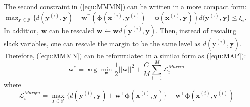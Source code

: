 The second constraint in (\ref{equ:MMMN}) can be written in a more compact form: 
$\max_{\mathbf{y}\in\mathcal{Y}} \{d(\mathbf{y}^{(i)},\mathbf{y})-{\mathbf{w}^\top} (\boldsymbol{\phi}(\mathbf{x}^{(i)},\mathbf{y}^{(i)})-\boldsymbol{\phi} 
        (\mathbf{x}^{(i)},\mathbf{y})) d(\mathbf{y}^{(i)},\mathbf{y}\}\leq \xi_i$. 
In addition, $\mathbf{w}$ can be rescaled $\mathbf{w}\gets \mathbf{w}d(\mathbf{y}^{(i)},\mathbf{y})$. 
Then, instead of rescaling slack variables, one can rescale the margin to be the same level as 
$d(\mathbf{y}^{(i)},\mathbf{y})$.  
Therefore, (\ref{equ:MMMN}) can be reformulated in a similar form as (\ref{equ:MAP}):
\begin{equation}
        \mathbf{w}^* = \arg\min_{\mathbf{w}} \frac{1}{2} ||\mathbf{w}||^2+ \frac{C}{M}\sum_{i=1}^M \mathcal{L}^{Margin}_i 
    \label{equ:MMMN_compact}
\end{equation}
where 
\begin{equation} 
    \mathcal{L}^{Margin}_i=\max_{\mathbf{y}\in\mathcal{Y}} \{d(\mathbf{y}^{(i)},\mathbf{y})+ \mathbf{w}^\top\boldsymbol{\phi} 
        (\mathbf{x}^{(i)},\mathbf{y})\} -\mathbf{w}^\top\boldsymbol{\phi}(\mathbf{x}^{(i)},\mathbf{y}^{(i)})
\label{equ:MMMN_loss}
\end{equation}



